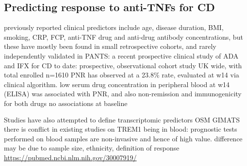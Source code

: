 \begin{outline}
\subsection{Predicting response to anti-TNFs for CD}

\1 previously reported clinical predictors include age, disease duration, BMI, smoking, CRP, FCP, anti-TNF drug and anti-drug antibody concentrations, but these have mostly been found in small retrospective cohorts, and rarely independently validated \autocite{ding2016SystematicReviewPredicting,kopylov2016PredictingDurableResponse,flamant2018InflammatoryBowelDisease,digby-bell2019InterrogatingHostImmunity,noor2020PersonalisedMedicineCrohn}
    \2 in PANTS: a recent prospective clinical study of ADA and IFX for CD to date: prospective, observational cohort study UK wide, with total enrolled n=1610 \autocite{kennedy2019PredictorsAntiTNFTreatment}
    \2 PNR has observed at a 23.8\% rate, evaluated at w14 via clinical algorithm.
    \2 low serum drug concentration in peripheral blood at w14 (ELISA) was associated with PNR, and also non-remission and immunogenicity for both drugs
    \2 no associations at baseline

\1 Studies have also attempted to define transcriptomic predictors \autocite{digby-bell2019InterrogatingHostImmunity,noor2020PersonalisedMedicineCrohn}
    \2 OSM \autocite{west2017OncostatinDrivesIntestinal}
    \2 GIMATS \autocite{martin2019SingleCellAnalysisCrohn}
    \2 there is conflict in existing studies on TREM1
    \2 \autocite{verstockt2019LowTREM1Expression}
        \3 being in blood: prognostic tests performed on blood samples are non-invasive and hence of high value.
    \2 \autocite{gaujoux2019CellcentredMetaanalysisReveals}
    \2 difference may be due to sample size, ethnicity, definition of response \url{https://pubmed.ncbi.nlm.nih.gov/30007919/} \autocite{digby-bell2019InterrogatingHostImmunity}


\end{outline}
